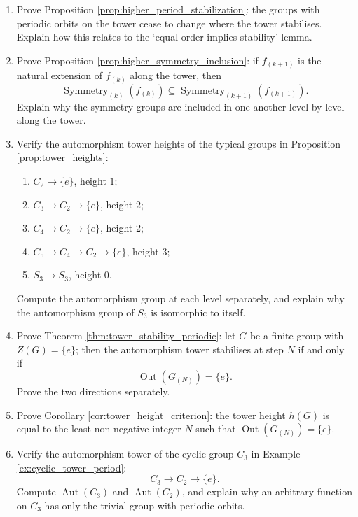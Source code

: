 \begin{enumerate}[leftmargin=3em, label=\textbf{Exercise \arabic*}]
    \item Prove Proposition \ref{prop:higher_period_stabilization}:
    the groups with periodic orbits on the tower cease to change where the tower stabilises. Explain how this relates to the `equal order implies stability' lemma.

    \item Prove Proposition \ref{prop:higher_symmetry_inclusion}:
    if $f_{(k+1)}$ is the natural extension of $f_{(k)}$ along the tower, then
    \[
    \operatorname{Symmetry}_{(k)}(f_{(k)})\subseteq
    \operatorname{Symmetry}_{(k+1)}(f_{(k+1)}).
    \]
    Explain why the symmetry groups are included in one another level by level along the tower.

    \item Verify the automorphism tower heights of the typical groups in Proposition \ref{prop:tower_heights}:
    \begin{enumerate}[label=(\roman*)]
        \item $C_2\to\{e\}$, height $1$;
        \item $C_3\to C_2\to\{e\}$, height $2$;
        \item $C_4\to C_2\to\{e\}$, height $2$;
        \item $C_5\to C_4\to C_2\to\{e\}$, height $3$;
        \item $S_3\to S_3$, height $0$.
    \end{enumerate}
    Compute the automorphism group at each level separately,
    and explain why the automorphism group of $S_3$ is isomorphic to itself.

    \item Prove Theorem \ref{thm:tower_stability_periodic}:
    let $G$ be a finite group with $Z(G)=\{e\}$;
    then the automorphism tower stabilises at step $N$ if and only if
    \[
    \operatorname{Out}(G_{(N)})=\{e\}.
    \]
    Prove the two directions separately.

    \item Prove Corollary \ref{cor:tower_height_criterion}:
    the tower height $h(G)$ is equal to the least non-negative integer $N$ such that $\operatorname{Out}(G_{(N)})=\{e\}$.

    \item Verify the automorphism tower of the cyclic group $C_3$ in Example \ref{ex:cyclic_tower_period}:
    \[
    C_3\to C_2\to\{e\}.
    \]
    Compute $\operatorname{Aut}(C_3)$ and $\operatorname{Aut}(C_2)$,
    and explain why an arbitrary function on $C_3$ has only the trivial group with periodic orbits.


\end{enumerate}
